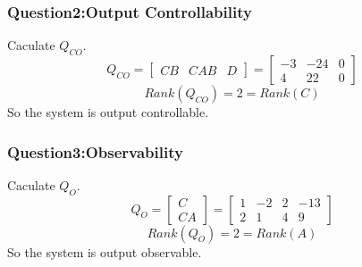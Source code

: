 \documentclass[12pt,a4paper,oneside]{ctexart}
\begin{document}
            \subsubsection{Question2:Output Controllability}
                Caculate $Q_{CO}$.
                $$Q_{CO} = \begin{bmatrix}
                    CB&CAB&D
                \end{bmatrix} = \begin{bmatrix}
                    -3&-24&0\\
                    4&22&0
                \end{bmatrix}$$
                $$Rank(Q_{CO})=2=Rank(C)$$
                So the system is output controllable.
                
            \subsubsection{Question3:Observability}
                Caculate $Q_{O}$.
                $$Q_{O} = \begin{bmatrix}
                    C\\
                    CA
                \end{bmatrix} = \begin{bmatrix}
                    1&-2&2&-13\\
                    2&1&4&9
                \end{bmatrix}$$
                $$Rank(Q_{O})=2=Rank(A)$$
                So the system is output observable.
\end{document}
